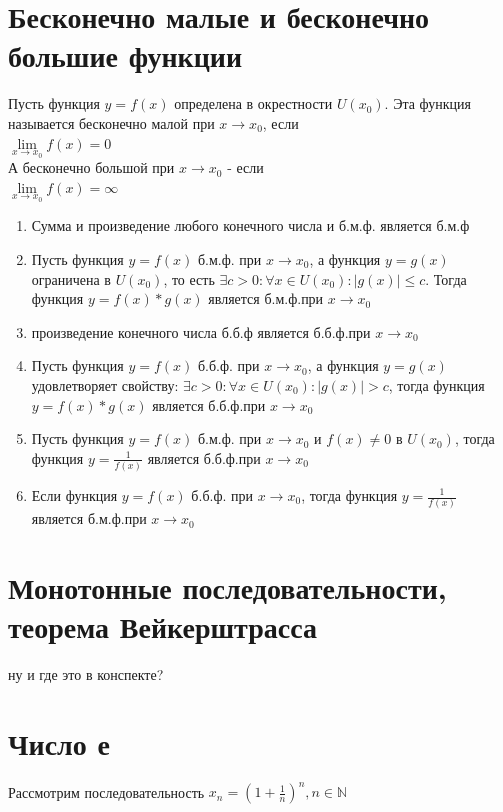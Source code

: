 \documentclass[oneside]{book}
\begin{document}
\begin{enumerate}
\chapter{Бесконечно малые и бесконечно большие функции\\}
Пусть функция $y = f(x)$ определена в окрестности $U(x_0)$. Эта функция называется бесконечно малой при $x \rightarrow x_0$, если\\ $\lim\limits_{x\rightarrow x_0}f(x)=0$\\
А бесконечно большой при $x \rightarrow x_0$ - если\\ $\lim\limits_{x\rightarrow x_0}f(x)=\infty$
\begin{enumerate}
\item Сумма и произведение любого конечного числа и б.м.ф. является б.м.ф
\item Пусть функция $y = f(x)$ б.м.ф. при $x \rightarrow x_0$, а функция $y = g(x)$ ограничена в $U(x_0)$, то есть  $\exists c > 0 : \forall x \in U(x_0): |g(x)|\leq c$. Тогда функция $y=f(x)*g(x)$ является б.м.ф.при $x \rightarrow x_0$
\item произведение конечного числа б.б.ф является б.б.ф.при $x \rightarrow x_0$
\item Пусть функция $y = f(x)$ б.б.ф. при $x \rightarrow x_0$, а функция $y = g(x)$ удовлетворяет свойству: $\exists c > 0 : \forall x \in U(x_0): |g(x)| > c$, тогда функция $y=f(x)*g(x)$ является б.б.ф.при $x \rightarrow x_0$
\item Пусть функция $y = f(x)$ б.м.ф. при $x \rightarrow x_0$ и $f(x) \neq 0$ в $U(x_0)$, тогда функция $y=\frac{1}{f(x)}$ является б.б.ф.при $x \rightarrow x_0$
\item Если функция $y = f(x)$ б.б.ф. при $x \rightarrow x_0$, тогда функция $y=\frac{1}{f(x)}$ является б.м.ф.при $x \rightarrow x_0$
\end{enumerate}

\chapter{Монотонные последовательности, теорема Вейкерштрасса\\}
ну и  где это в конспекте?

\chapter{Число е\\}
Рассмотрим последовательность $x_n=(1+\frac{1}{n})^n, n \in \mathbb{N}$\\

\end{enumerate}
\end{document}
